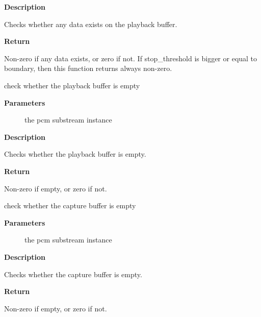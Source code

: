 \documentclass[a4paper,8pt,english]{sphinxmanual}
\begin{document}
\textbf{Description}

Checks whether any data exists on the playback buffer.

\textbf{Return}

Non-zero if any data exists, or zero if not. If stop\_threshold
is bigger or equal to boundary, then this function returns always non-zero.

\begin{fulllineitems}
\label{sound/kernel-api/alsa-driver-api:c.snd_pcm_playback_empty}
check whether the playback buffer is empty

\end{fulllineitems}


\textbf{Parameters}
\begin{description}
\item[{}] \leavevmode
the pcm substream instance

\end{description}

\textbf{Description}

Checks whether the playback buffer is empty.

\textbf{Return}

Non-zero if empty, or zero if not.

\begin{fulllineitems}
\label{sound/kernel-api/alsa-driver-api:c.snd_pcm_capture_empty}
check whether the capture buffer is empty

\end{fulllineitems}


\textbf{Parameters}
\begin{description}
\item[{}] \leavevmode
the pcm substream instance

\end{description}

\textbf{Description}

Checks whether the capture buffer is empty.

\textbf{Return}

Non-zero if empty, or zero if not.
\end{document}
